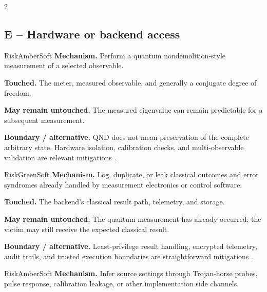\begin{multicols}{2}
\columnbreak
\subsection*{E -- Hardware or backend access}
\hypertarget{cell:E1}{}
\begin{matrixrecord}{RiskAmberSoft}
\textbf{Mechanism.} Perform a quantum nondemolition-style measurement of a selected observable.

\textbf{Touched.} The meter, measured observable, and generally a conjugate degree of freedom.

\textbf{May remain untouched.} The measured eigenvalue can remain predictable for a subsequent measurement.

\textbf{Boundary / alternative.} QND does not mean preservation of the complete arbitrary state. Hardware isolation, calibration checks, and multi-observable validation are relevant mitigations \cite{unnikrishnan2018qnd}.

\hfill\matrixback
\end{matrixrecord}

\hypertarget{cell:E2}{}
\begin{matrixrecord}{RiskGreenSoft}
\textbf{Mechanism.} Log, duplicate, or leak classical outcomes and error syndromes already handled by measurement electronics or control software.

\textbf{Touched.} The backend's classical result path, telemetry, and storage.

\textbf{May remain untouched.} The quantum measurement has already occurred; the victim may still receive the expected classical result.

\textbf{Boundary / alternative.} Least-privilege result handling, encrypted telemetry, audit trails, and trusted execution boundaries are straightforward mitigations \cite{ashsaki2023primer}.

\hfill\matrixback
\end{matrixrecord}

\hypertarget{cell:E3}{}
\begin{matrixrecord}{RiskAmberSoft}
\textbf{Mechanism.} Infer source settings through Trojan-horse probes, pulse response, calibration leakage, or other implementation side channels.


\end{matrixrecord}
\end{multicols}
